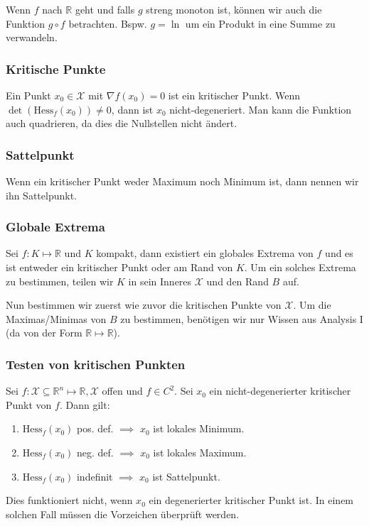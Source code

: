 \documentclass[a4paper,10pt]{article}
\def\R{\mathbb{R}}
\def\X{\mathcal{X}}
\begin{document}
Wenn $f$ nach $\R$ geht und falls $g$ streng monoton ist, können wir auch die Funktion $g \circ f$ betrachten. Bspw. $g = \ln$ um ein Produkt in eine Summe zu verwandeln.

\subsubsection*{Kritische Punkte}
Ein Punkt \(x_0 \in \X\) mit \(\nabla f(x_0) = 0\) ist ein kritischer Punkt. Wenn \(\det(\text{Hess}_f(x_0)) \ne 0\), dann ist \(x_0\) nicht-degeneriert. Man kann die Funktion auch quadrieren, da dies die Nullstellen nicht ändert.

\subsubsection*{Sattelpunkt}
Wenn ein kritischer Punkt weder Maximum noch Minimum ist, dann nennen wir ihn Sattelpunkt.

\subsubsection*{Globale Extrema}
Sei \(f: K \mapsto \R\) und \(K\) kompakt, dann existiert ein globales Extrema von \(f\) und es ist entweder ein kritischer Punkt oder am Rand von \(K\). Um ein solches Extrema zu bestimmen, teilen wir \(K\) in sein Inneres \(\X\) und den Rand \(B\) auf. 

Nun bestimmen wir zuerst wie zuvor die kritischen Punkte von \(\X\). Um die Maximas/Minimas von \(B\) zu bestimmen, benötigen wir nur Wissen aus Analysis I (da von der Form \(\R \mapsto \R\)).
\subsubsection*{Testen von kritischen Punkten}
Sei \(f: \X \subseteq \R^n \mapsto \R, \X\) offen und \(f\in C^2\). Sei \(x_0\) ein nicht-degenerierter kritischer Punkt von \(f\). Dann gilt:
\begin{enumerate}
  \item $\text{Hess}_f(x_0)$ pos. def. \(\implies\) $x_0$ ist lokales Minimum.
  \item $\text{Hess}_f(x_0)$ neg. def. \(\implies\) $x_0$ ist lokales Maximum.
  \item $\text{Hess}_f(x_0)$ indefinit \(\implies\) $x_0$ ist Sattelpunkt.
\end{enumerate}
Dies funktioniert nicht, wenn \(x_0\) ein degenerierter kritischer Punkt ist. In einem solchen Fall müssen die Vorzeichen überprüft werden.
\end{document}
